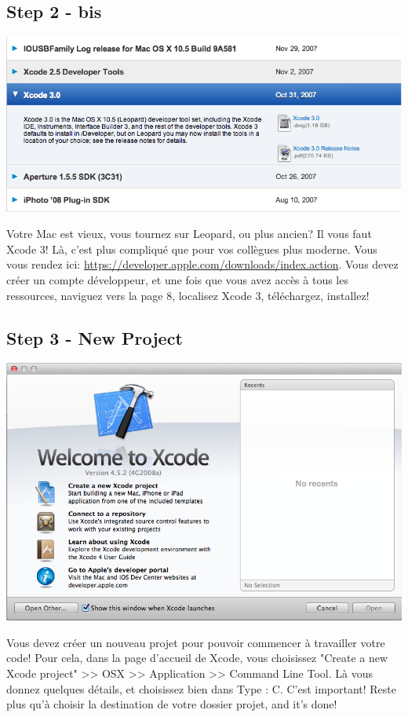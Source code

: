 \documentclass[11pt,a4paper]{article}
\begin{document}
\subsection{Step 2 - bis}
\begin{minipage}[c]{.40\linewidth}
\includegraphics[width=\linewidth]{xcode3.png}
\end{minipage} \hfill
\begin{minipage}[c]{.50\linewidth}
Votre Mac est vieux, vous tournez sur Leopard, ou plus ancien? Il vous faut Xcode 3! Là, c'est plus compliqué que pour vos collègues plus moderne. Vous vous rendez ici: \url{https://developer.apple.com/downloads/index.action}. Vous devez créer un compte développeur, et une fois que vous avez accès à tous les ressources, naviguez vers la page 8, localisez Xcode 3, téléchargez, installez!
\end{minipage}

\subsection{Step 3 - New Project}
\begin{minipage}[c]{.40\linewidth}
\includegraphics[width=\linewidth]{project.png}
\end{minipage} \hfill
\begin{minipage}[c]{.50\linewidth}
Vous devez créer un nouveau projet pour pouvoir commencer à travailler votre code! Pour cela, dans la page d'accueil de Xcode, vous choisissez "Create a new Xcode project" >> OSX >> Application >> Command Line Tool. Là vous donnez quelques détails, et choisissez bien dans Type : C. C'est important! Reste plus qu'à choisir la destination de votre dossier projet, and it's done!
\end{minipage}
\end{document}
